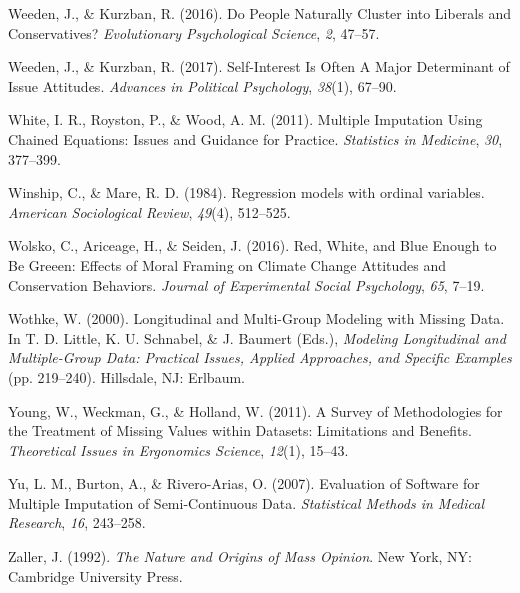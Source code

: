 \documentclass[12pt,econ]{sources/authesis}
\begin{document}
\leavevmode\hypertarget{ref-weeden_2016_people}{}%
Weeden, J., \& Kurzban, R. (2016). Do People Naturally Cluster into Liberals and Conservatives? \emph{Evolutionary Psychological Science}, \emph{2}, 47--57.

\leavevmode\hypertarget{ref-weeden_2017_self-interest}{}%
Weeden, J., \& Kurzban, R. (2017). Self-Interest Is Often A Major Determinant of Issue Attitudes. \emph{Advances in Political Psychology}, \emph{38}(1), 67--90.

\leavevmode\hypertarget{ref-white_2011_multiple}{}%
White, I. R., Royston, P., \& Wood, A. M. (2011). Multiple Imputation Using Chained Equations: Issues and Guidance for Practice. \emph{Statistics in Medicine}, \emph{30}, 377--399.

\leavevmode\hypertarget{ref-winship_1984_regression}{}%
Winship, C., \& Mare, R. D. (1984). Regression models with ordinal variables. \emph{American Sociological Review}, \emph{49}(4), 512--525.

\leavevmode\hypertarget{ref-wolsko_2016_white}{}%
Wolsko, C., Ariceage, H., \& Seiden, J. (2016). Red, White, and Blue Enough to Be Greeen: Effects of Moral Framing on Climate Change Attitudes and Conservation Behaviors. \emph{Journal of Experimental Social Psychology}, \emph{65}, 7--19.

\leavevmode\hypertarget{ref-wothke_2000_longitudinal}{}%
Wothke, W. (2000). Longitudinal and Multi-Group Modeling with Missing Data. In T. D. Little, K. U. Schnabel, \& J. Baumert (Eds.), \emph{Modeling Longitudinal and Multiple-Group Data: Practical Issues, Applied Approaches, and Specific Examples} (pp. 219--240). Hillsdale, NJ: Erlbaum.

\leavevmode\hypertarget{ref-young_2011_survey}{}%
Young, W., Weckman, G., \& Holland, W. (2011). A Survey of Methodologies for the Treatment of Missing Values within Datasets: Limitations and Benefits. \emph{Theoretical Issues in Ergonomics Science}, \emph{12}(1), 15--43.

\leavevmode\hypertarget{ref-yu_2007_evaluation}{}%
Yu, L. M., Burton, A., \& Rivero-Arias, O. (2007). Evaluation of Software for Multiple Imputation of Semi-Continuous Data. \emph{Statistical Methods in Medical Research}, \emph{16}, 243--258.

\leavevmode\hypertarget{ref-zaller_nature_1992}{}%
Zaller, J. (1992). \emph{The Nature and Origins of Mass Opinion}. New York, NY: Cambridge University Press.
\end{document}
